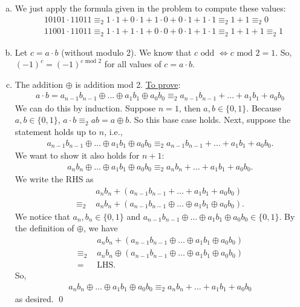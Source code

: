 \documentclass{book}
\theoremstyle{definition}
\newcommand{\nn}{\nonumber}
\newcommand{\lp}{\left(}
\newcommand{\rp}{\right)}
\begin{document}
\begin{enumerate}[(a)]
	\item We just apply the formula given in the problem to compute these values:
	\begin{align}
	&10101 \cdot 11011 \equiv_2 1\cdot 1 + 0\cdot 1 + 1\cdot 0 + 0 \cdot 1 + 1 \cdot 1 \equiv_2 1 + 1 \equiv_2 \boxed{0}\nn\\
	&11001 \cdot 11011 \equiv_2 1\cdot 1 + 1 \cdot 1 + 0 \cdot 0 + 0 \cdot 1 + 1\cdot 1 \equiv_2 1 + 1 + 1\equiv_2 \boxed{1}\nn
	\end{align} 
	\item Let  $c = a\cdot b$ (without modulo 2). We know that $c \text{ odd } \iff c\text{ mod } 2 = 1$. So, $(-1)^c = (-1)^{c\text{ mod } 2}$ for all values of $c = a\cdot b$.  

	\item The addition $\oplus$ is addition mod 2. \underline{To prove}:
	\begin{align}
	a\cdot b = a_{n-1}b_{n-1} \oplus\dots \oplus a_1b_1 \oplus a_0b_0 \equiv_2 a_{n-1}b_{n-1} + \dots + a_1b_1 + a_0b_0
	\end{align}
	We can do this by induction. Suppose $n=1$, then $a,b\in \{0,1\}$. Because $a,b\in \{0,1\}$, $a\cdot b \equiv_2 ab = a\oplus b$. So this base case holds. Next, suppose the statement holds up to $n$, i.e.,
	\begin{align}
	a_{n-1}b_{n-1} \oplus\dots \oplus a_1b_1 \oplus a_0b_0 \equiv_2 a_{n-1}b_{n-1} + \dots + a_1b_1 + a_0b_0.
	\end{align}  
	We want to show it also holds for $n+1$:
	\begin{align}
	a_{n}b_{n} \oplus\dots \oplus a_1b_1 \oplus a_0b_0 \equiv_2 a_{n}b_{n} + \dots + a_1b_1 + a_0b_0.
	\end{align} 
	We write the RHS as
	\begin{align}
	&a_nb_n + \lp a_{n-1}b_{n-1} + \dots + a_1b_1 + a_0b_0 \rp \nn\\
	\equiv_2\,\,& a_nb_n + \lp a_{n-1}b_{n-1} \oplus\dots \oplus a_1b_1 \oplus a_0b_0 \rp.
	\end{align}
	We notice that $a_n,b_n\in \{0,1\}$ and $a_{n-1}b_{n-1} \oplus\dots \oplus a_1b_1 \oplus a_0b_0 \in \{0,1\}$. By the definition of $\oplus$, we have
	\begin{align}
	&a_nb_n + \lp a_{n-1}b_{n-1} \oplus\dots \oplus a_1b_1 \oplus a_0b_0 \rp\nn\\ 
	\equiv_2\,\,& a_nb_n \oplus \lp a_{n-1}b_{n-1} \oplus\dots \oplus a_1b_1 \oplus a_0b_0 \rp\nn\\
	=\,\,&\text{LHS}.
	\end{align}
	So, 
	\begin{align}
	a_{n}b_{n} \oplus\dots \oplus a_1b_1 \oplus a_0b_0 \equiv_2 a_{n}b_{n} + \dots + a_1b_1 + a_0b_0
	\end{align}
	as desired. \qed
	
	
	
	
	
	
	
	

	
\end{enumerate}
\end{document}
